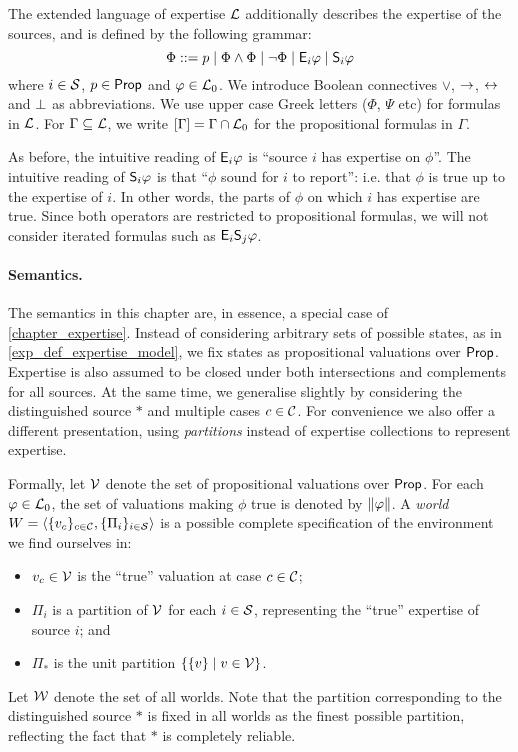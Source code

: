 The extended language of expertise $\lext$ additionally describes the
expertise of the sources, and is defined by the following grammar:
\[
    \Phi ::= p \mid
             \Phi \land \Phi \mid
             \neg \Phi \mid
             \E_i\phi \mid
             \S_i\phi
             \\
\]
where $i\in \srcs$, $p \in \propvars$ and $\phi \in \lprop$. We introduce
Boolean connectives $\lor$, $\limplies$, $\liff$ and $\falsum$ as
abbreviations. We use upper case Greek letters ($\Phi$, $\Psi$ etc) for
formulas in $\lext$.
%
For $\Gamma \subseteq \lext$, we write $\proppart{\Gamma} = \Gamma \cap
\lprop$ for the propositional formulas in $\Gamma$.

As before, the intuitive reading of $\E_i\phi$ is ``source $i$ has expertise on
$\phi$''. The intuitive reading of $\S_i\phi$ is that ``$\phi$ sound for $i$ to
report'': i.e. that $\phi$ is true up to the expertise of $i$. In other words,
the parts of $\phi$ on which $i$ has expertise are true. Since both operators
are restricted to propositional formulas, we will not consider iterated
formulas such as $\E_i\S_j\phi$.

\paragraph{Semantics.}

The semantics in this chapter are, in essence, a special case of
\cref{chapter_expertise}. Instead of considering arbitrary sets of possible
states, as in \cref{exp_def_expertise_model}, we fix states as propositional
valuations over $\propvars$. Expertise is also assumed to be closed under both
intersections and complements for all sources.
%
At the same time, we generalise slightly by considering the distinguished
source $\ast$ and multiple cases $c \in \C$. For convenience we also offer a
different presentation, using \emph{partitions} instead of expertise
collections to represent expertise.

Formally, let $\vals$ denote the set of propositional valuations over
$\propvars$. For each $\phi \in \lprop$, the set of valuations making $\phi$
true is denoted by $\propmods{\phi}$. A \emph{world} $W = \tuple{\{v_c\}_{c \in
\C}, \{\Pi_i\}_{i \in \srcs}}$ is a possible complete specification of the
environment we find ourselves in:
\begin{itemize}
    \item $v_c \in \vals$ is the ``true'' valuation at case $c \in \C$;
    \item $\Pi_i$ is a partition of $\vals$ for each $i \in \srcs$, representing
          the ``true'' expertise of source $i$; and
    \item $\Pi_\ast$ is the unit partition $\{\{v\} \mid v \in \vals\}$.
\end{itemize}
Let $\W$ denote the set of all worlds. Note that the partition corresponding
to the distinguished source $\ast$ is fixed in all worlds as the finest
possible partition, reflecting the fact that $\ast$ is completely reliable.

